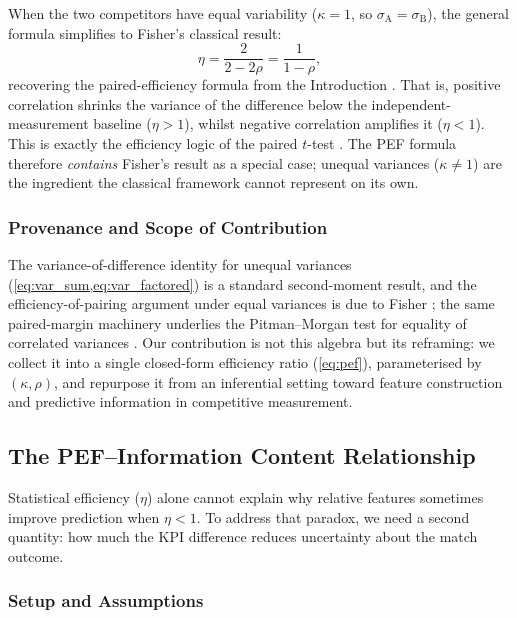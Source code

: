 When the two competitors have equal variability ($\kappa=1$, so $\sigma_{\mathrm{A}}=\sigma_{\mathrm{B}}$), the general formula simplifies to Fisher's classical result:
\begin{equation*}
  \eta = \frac{2}{2-2\rho} = \frac{1}{1-\rho},
\end{equation*}
recovering the paired-efficiency formula from the Introduction \parencite{fisher1935}. That is, positive correlation shrinks the variance of the difference below the independent-measurement baseline ($\eta>1$), whilst negative correlation amplifies it ($\eta<1$). This is exactly the efficiency logic of the paired $t$-test \cite{student1908}. The PEF formula therefore \emph{contains} Fisher's result as a special case; unequal variances ($\kappa\neq 1$) are the ingredient the classical framework cannot represent on its own.

\subsubsection{Provenance and Scope of Contribution}

The variance-of-difference identity for unequal variances (\cref{eq:var_sum,eq:var_factored}) is a standard second-moment result, and the efficiency-of-pairing argument under equal variances is due to Fisher \parencite{fisher1935}; the same paired-margin machinery underlies the Pitman--Morgan test for equality of correlated variances \parencite{pitman1939,morgan1939}. Our contribution is not this algebra but its reframing: we collect it into a single closed-form efficiency ratio (\cref{eq:pef}), parameterised by $(\kappa,\rho)$, and repurpose it from an inferential setting toward feature construction and predictive information in competitive measurement.

\subsection{The PEF--Information Content Relationship}

Statistical efficiency ($\eta$) alone cannot explain why relative features sometimes improve prediction when $\eta<1$. To address that paradox, we need a second quantity: how much the KPI difference reduces uncertainty about the match outcome.

\subsubsection{Setup and Assumptions}
\label{sec:mi_setup}

